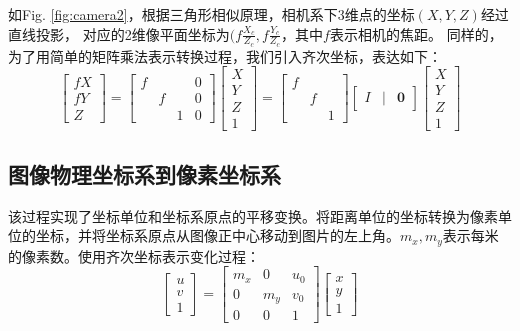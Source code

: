 \documentclass[10pt,a4paper]{article}
\begin{document}
\begin{CJK*}{UTF8}{gbsn}
如Fig. \ref{fig:camera2}，根据三角形相似原理，相机系下3维点的坐标$(X,Y,Z)$经过直线投影，
对应的2维像平面坐标为$(f\frac{X_c}{Z_c}, f\frac{Y_c}{Z_c}$，其中$f$表示相机的焦距。
同样的，为了用简单的矩阵乘法表示转换过程，我们引入齐次坐标，表达如下：
\begin{equation}
\label{eq:in1}
\begin{bmatrix}
fX \\ fY \\ Z
\end{bmatrix} = 
\begin{bmatrix}
f &   &   & 0 \\
  & f &   & 0 \\
  &   & 1 & 0
\end{bmatrix} \begin{bmatrix} X \\ Y \\ Z \\ 1 \end{bmatrix}
=
\begin{bmatrix}
f &   &   \\
  & f &   \\
  &   & 1
\end{bmatrix} \begin{bmatrix}  I & | & \mathbf{0}\end{bmatrix} \begin{bmatrix} X \\ Y \\ Z \\ 1 \end{bmatrix}
\end{equation}

\subsection{图像物理坐标系到像素坐标系}
该过程实现了坐标单位和坐标系原点的平移变换。将距离单位的坐标转换为像素单位的坐标，并将坐标系原点从图像正中心移动到图片的左上角。$m_x, m_y$表示每米的像素数。使用齐次坐标表示变化过程：
\begin{equation}
\begin{bmatrix}
u \\ v \\ 1
\end{bmatrix}=
\begin{bmatrix}
m_x & 0 & u_0 \\
0 & m_y & v_0 \\
0 & 0 & 1
\end{bmatrix} \begin{bmatrix} x \\ y \\ 1 \end{bmatrix}
\label{eq:in2}
\end{equation}


\end{CJK*}
\end{document}
